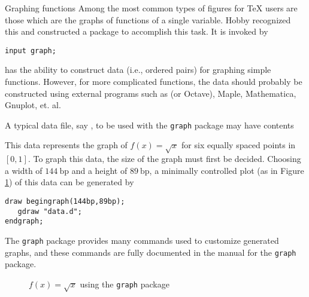 \begin{section}{Graphing functions}
Among the most common types of figures for \TeX{} users are those which are the graphs of functions of a single variable.  Hobby recognized this and constructed a package to accomplish this task.  It is invoked by
\begin{lstlisting}[xleftmargin=80bp]
input graph;
\end{lstlisting}
\MP{} has the ability to construct data (i.e., ordered pairs) for graphing simple functions.  However, for more complicated functions, the data should probably be constructed using external programs such as  (or Octave), Maple, Mathematica, Gnuplot, et. al.

A typical data file, say , to be used with the \texttt{graph} package may have contents

This data represents the graph of $f(x)=\sqrt{x}$ for six equally spaced points in $[0,1]$.  To graph this data, the size of the graph must first be decided.  Choosing a width of $144\mathrm{\ bp}$ and a height of $89\mathrm{\ bp}$, a minimally controlled plot (as in Figure \ref{fig:data}) of this data can be generated by
\begin{lstlisting}[xleftmargin=38bp]
draw begingraph(144bp,89bp);
   gdraw "data.d";
endgraph;
\end{lstlisting}
The \texttt{graph} package provides many commands used to customize generated graphs, and these commands are fully documented in the manual \cite{hobby:graph} for the \texttt{graph} package.
\begin{figure}[ht]
   \begin{center}\end{center}
   \caption{$f(x)=\sqrt{x}$ using the \texttt{graph} package}\label{fig:data}
\end{figure}
\end{section}
